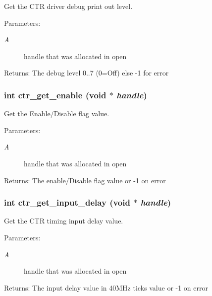 Get the CTR driver debug print out level. 

\begin{Desc}
\item[Parameters:]
\begin{description}
\item[{\em A}]handle that was allocated in open \end{description}
\end{Desc}
\begin{Desc}
\item[Returns:]The debug level 0..7 (0=Off) else -1 for error \end{Desc}
\subsubsection{\setlength{\rightskip}{0pt plus 5cm}int ctr\_\-get\_\-enable (void $\ast$ {\em handle})}\label{libctr_8doxygen_c3fe86f1f41553673716c7b5c34aa974}


Get the Enable/Disable flag value. 

\begin{Desc}
\item[Parameters:]
\begin{description}
\item[{\em A}]handle that was allocated in open \end{description}
\end{Desc}
\begin{Desc}
\item[Returns:]The enable/Disable flag value or -1 on error \end{Desc}
\subsubsection{\setlength{\rightskip}{0pt plus 5cm}int ctr\_\-get\_\-input\_\-delay (void $\ast$ {\em handle})}\label{libctr_8doxygen_b2e136d3278da57fb43bca762a68f42d}


Get the CTR timing input delay value. 

\begin{Desc}
\item[Parameters:]
\begin{description}
\item[{\em A}]handle that was allocated in open \end{description}
\end{Desc}
\begin{Desc}
\item[Returns:]The input delay value in 40MHz ticks value or -1 on error \end{Desc}
